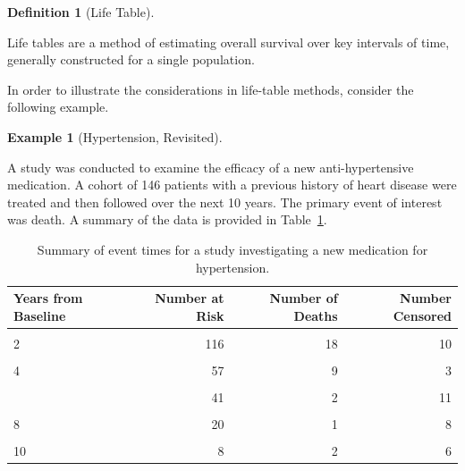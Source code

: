 \documentclass[
  letterpaper,
  DIV=11,
  numbers=noendperiod]{scrreprt}
\theoremstyle{definition}
\newtheorem{definition}{Definition}[chapter]
\theoremstyle{definition}
\newtheorem{example}{Example}[chapter]
\theoremstyle{remark}
\begin{document}
\begin{definition}[Life
Table]\protect\hypertarget{def-life-table}{}\label{def-life-table}

Life tables are a method of estimating overall survival over key
intervals of time, generally constructed for a single population.

\end{definition}

In order to illustrate the considerations in life-table methods,
consider the following example.

\begin{example}[Hypertension,
Revisited]\protect\hypertarget{exm-surv-hypertension-expanded}{}\label{exm-surv-hypertension-expanded}

A study was conducted to examine the efficacy of a new anti-hypertensive
medication. A cohort of 146 patients with a previous history of heart
disease were treated and then followed over the next 10 years. The
primary event of interest was death. A summary of the data is provided
in Table~\ref{tbl-surv-hypertension-data}.

\end{example}

\hypertarget{tbl-surv-hypertension-data}{}
\begin{table}
\caption{\label{tbl-surv-hypertension-data}Summary of event times for a study investigating a new medication for
hypertension. }\tabularnewline

\centering
\begin{tabular}[t]{lrrr}
\toprule
Years from Baseline & Number at Risk & Number of Deaths & Number Censored\\
\midrule
\cellcolor{gray!10}{1} & \cellcolor{gray!10}{146} & \cellcolor{gray!10}{27} & \cellcolor{gray!10}{3}\\
2 & 116 & 18 & 10\\
\cellcolor{gray!10}{3} & \cellcolor{gray!10}{88} & \cellcolor{gray!10}{21} & \cellcolor{gray!10}{10}\\
4 & 57 & 9 & 3\\
\cellcolor{gray!10}{5} & \cellcolor{gray!10}{45} & \cellcolor{gray!10}{1} & \cellcolor{gray!10}{3}\\
\addlinespace
6 & 41 & 2 & 11\\
\cellcolor{gray!10}{7} & \cellcolor{gray!10}{28} & \cellcolor{gray!10}{3} & \cellcolor{gray!10}{5}\\
8 & 20 & 1 & 8\\
\cellcolor{gray!10}{9} & \cellcolor{gray!10}{11} & \cellcolor{gray!10}{2} & \cellcolor{gray!10}{1}\\
10 & 8 & 2 & 6\\
\bottomrule
\end{tabular}
\end{table}
\end{document}
